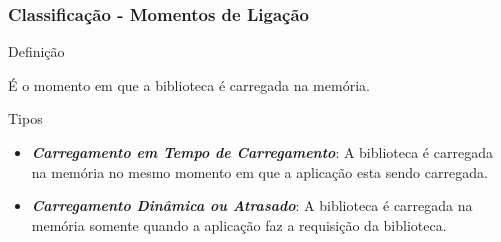 \begin{frame}
 \frametitle{Classificação - Momentos de Ligação}

 \begin{block}{Definição}

  É o momento em que a biblioteca é carregada na memória.

 \end{block}

 \begin{block}{Tipos}

  \begin{itemize}

   \item \emph{\textbf{Carregamento em Tempo de Carregamento}}: A biblioteca é carregada na memória no mesmo
   momento em que a aplicação esta sendo carregada.

   \item \emph{\textbf{Carregamento Dinâmica ou Atrasado}}: A biblioteca é carregada na memória somente quando
   a aplicação faz a requisição da biblioteca.

  \end{itemize}

 \end{block}

\end{frame}


